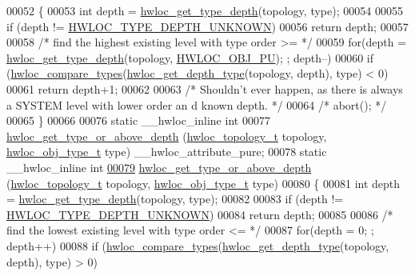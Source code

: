 \begin{DoxyCode}
{{00052 \{
00053   \textcolor{keywordtype}{int} depth = \hyperlink{a00046_gaea7c64dd59467f5201ba87712710b14d}{hwloc_get_type_depth}(topology, type);
00054 
00055   \textcolor{keywordflow}{if} (depth != \hyperlink{a00046_ggaf4e663cf42bbe20756b849c6293ef575a0565ab92ab72cb0cec91e23003294aad}{HWLOC_TYPE_DEPTH_UNKNOWN})
00056     \textcolor{keywordflow}{return} depth;
00057 
00058   \textcolor{comment}{/* find the highest existing level with type order >= */}
00059   \textcolor{keywordflow}{for}(depth = \hyperlink{a00046_gaea7c64dd59467f5201ba87712710b14d}{hwloc_get_type_depth}(topology, \hyperlink{a00041_ggacd37bb612667dc437d66bfb175a8dc55abca6887e80cb291353b0a0c1da83f661}{HWLOC_OBJ_PU}); ; depth--)
00060     \textcolor{keywordflow}{if} (\hyperlink{a00041_gabd7da4f4ea12b420b8ecbde458b27805}{hwloc_compare_types}(\hyperlink{a00046_gadd4964764ae7e49231065d58a553fd31}{hwloc_get_depth_type}(topology, depth), type) < 0)
00061       \textcolor{keywordflow}{return} depth+1;
00062 
00063   \textcolor{comment}{/* Shouldn't ever happen, as there is always a SYSTEM level with lower order an
      d known depth.  */}
00064   \textcolor{comment}{/* abort(); */}
00065 \}
00066 
00076 \textcolor{keyword}{static} \_\_hwloc\_inline \textcolor{keywordtype}{int}
00077 \hyperlink{a00052_ga62a3f401854c209605c90079700f4bc5}{hwloc_get_type_or_above_depth} (\hyperlink{a00039_ga9d1e76ee15a7dee158b786c30b6a6e38}{hwloc_topology_t} topology, \hyperlink{a00041_gacd37bb612667dc437d66bfb175a8dc55}{hwloc_obj_type_t} type) 
      \_\_hwloc\_attribute\_pure;
00078 \textcolor{keyword}{static} \_\_hwloc\_inline \textcolor{keywordtype}{int}
\hypertarget{a00031_source_l00079}{}\hyperlink{a00052_ga62a3f401854c209605c90079700f4bc5}{00079} \hyperlink{a00052_ga62a3f401854c209605c90079700f4bc5}{hwloc_get_type_or_above_depth} (\hyperlink{a00039_ga9d1e76ee15a7dee158b786c30b6a6e38}{hwloc_topology_t} topology, \hyperlink{a00041_gacd37bb612667dc437d66bfb175a8dc55}{hwloc_obj_type_t} type)
00080 \{
00081   \textcolor{keywordtype}{int} depth = \hyperlink{a00046_gaea7c64dd59467f5201ba87712710b14d}{hwloc_get_type_depth}(topology, type);
00082 
00083   \textcolor{keywordflow}{if} (depth != \hyperlink{a00046_ggaf4e663cf42bbe20756b849c6293ef575a0565ab92ab72cb0cec91e23003294aad}{HWLOC_TYPE_DEPTH_UNKNOWN})
00084     \textcolor{keywordflow}{return} depth;
00085 
00086   \textcolor{comment}{/* find the lowest existing level with type order <= */}
00087   \textcolor{keywordflow}{for}(depth = 0; ; depth++)
00088     \textcolor{keywordflow}{if} (\hyperlink{a00041_gabd7da4f4ea12b420b8ecbde458b27805}{hwloc_compare_types}(\hyperlink{a00046_gadd4964764ae7e49231065d58a553fd31}{hwloc_get_depth_type}(topology, depth), type) > 0)
}}
\end{DoxyCode}
